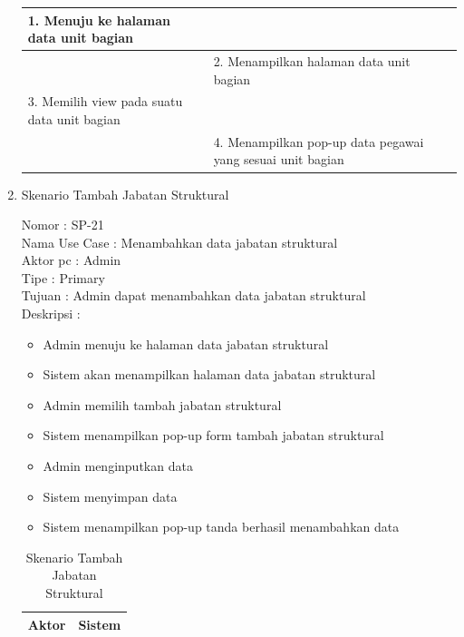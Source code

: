 \begin{enumerate}
\begin{table}
\begin{tabular}{ | p{58mm} | p{70mm} |}
		1.	Menuju ke halaman data unit bagian &  \\
		
		\hline
		
		&  2.	Menampilkan halaman data unit bagian \\
		
		\hline
		
		3. Memilih view pada suatu data unit bagian & \\
		
		\hline
		
		& 4.	Menampilkan pop-up data pegawai yang sesuai unit bagian \\
		\hline
		
	\end{tabular}
\end{table}

\item Skenario Tambah Jabatan Struktural

Nomor \kern 3.6pc : SP-21 \\
Nama Use Case : Menambahkan data jabatan struktural \\
Aktor  pc : Admin \\
Tipe \kern 4.6pc : Primary \\
Tujuan \kern 3.6pc : Admin dapat menambahkan data jabatan struktural\\
Deskripsi \kern 2.5pc : 

\begin{itemize}
	\item Admin menuju ke halaman data jabatan struktural
	\item Sistem akan menampilkan halaman data jabatan struktural
	\item Admin memilih tambah jabatan struktural
	\item Sistem menampilkan pop-up form tambah jabatan struktural
	\item Admin menginputkan data
	\item Sistem menyimpan data
	\item Sistem menampilkan pop-up tanda berhasil menambahkan data
	
\end{itemize}

\begin{table}
	\caption{Skenario Tambah Jabatan Struktural}
	\centering
	\begin{tabular}{ | p{60mm} | p{68mm} |}
		\hline 
		\textbf{Aktor} & \textbf{Sistem} \\
		\hline
		

\end{tabular}
\end{table}
\end{enumerate}
